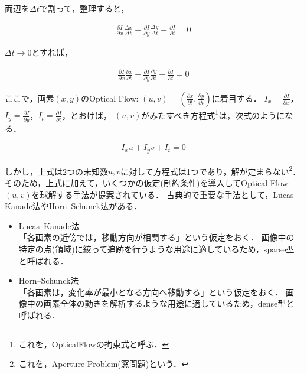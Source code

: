 \documentclass[11pt,a4j]{jarticle}
\begin{document}
      両辺を$\Delta t$で割って，整理すると，

      \begin{align}
        \frac{\partial I}{\partial x} \frac{\Delta x}{\Delta t} + \frac{\partial I}{\partial y} \frac{\Delta y}{\Delta t} + \frac{\partial I}{\partial t} = 0
      \end{align}

      $\Delta t \to 0$とすれば，

      \begin{align}
        \frac{\partial I}{\partial x} \frac{\partial x}{\partial t} + \frac{\partial I}{\partial y} \frac{\partial y}{\partial t} + \frac{\partial I}{\partial t} = 0
      \end{align}

      ここで，画素$(x,y)$のOptical Flow: $(u,v) = \left(\frac{\partial x}{\partial t}, \frac{\partial y}{\partial t} \right)$に着目する．
      $I_x = \frac{\partial I}{\partial x}$，$I_y = \frac{\partial I}{\partial y}$，$I_t = \frac{\partial I}{\partial t}$，とおけば，
      $(u,v)$がみたすべき方程式\footnote{これを，OpticalFlowの拘束式と呼ぶ．}は，次式のようになる．

      \begin{align}
        I_x u + I_y v + I_t = 0
      \end{align}

      しかし，上式は2つの未知数$u,v$に対して方程式は1つであり，解が定まらない\footnote{これを，Aperture Problem(窓問題)という．}．\cite{Szeliski:2010:CVA:1941882}
      そのため，上式に加えて，いくつかの仮定(制約条件)を導入してOptical Flow: $(u,v)$を球解する手法が提案されている．
      古典的で重要な手法として，Lucas–Kanade法やHorn–Schunck法がある．\cite{Horn:1980:DOF:888857}\cite{Lucas:1981:IIR:1623264.1623280}\cite{Harris88acombined}\cite{Tomasi91detectionand}

      \begin{itemize}
        \item Lucas–Kanade法 \\
          「各画素の近傍では，移動方向が相関する」という仮定をおく．
          画像中の特定の点(領域)に絞って追跡を行うような用途に適しているため，sparse型と呼ばれる．
        \item Horn–Schunck法 \\
          「各画素は，変化率が最小となる方向へ移動する」という仮定をおく．
          画像中の画素全体の動きを解析するような用途に適しているため，dense型と呼ばれる．
      \end{itemize}
\end{document}
